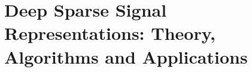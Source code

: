 \documentclass[12pt]{article}
\def\HCode#1{}
\renewenvironment{itemize}{
  \begin{list}{}{
    \setlength{\itemsep}{0.25em}
    \setlength{\parskip}{0pt}
    \setlength{\parsep}{0.25em}
  }
}{
  \end{list}
}
\begin{document}
\HCode{<div class="row">}
\HCode{<div class="col-md-12">}
%
%
%


\section*{Deep Sparse Signal Representations: Theory, Algorithms and Applications}
\end{document}
